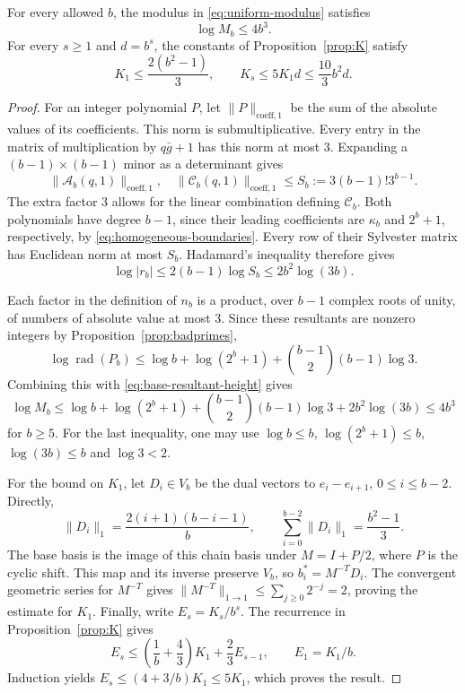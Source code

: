 \documentclass[12pt]{article}
\newcommand{\rad}{\operatorname{rad}}
\newcommand{\gpoly}{g}
\begin{document}
\begin{lemma}\label{lem:AP-heights}
For every allowed $b$, the modulus in \eqref{eq:uniform-modulus} satisfies
\[
\log M_b\le4b^3.
\]
For every $s\ge1$ and $d=b^s$, the constants of Proposition~\ref{prop:K} satisfy
\[
K_1\le\frac{2(b^2-1)}3,\qquad
K_s\le5K_1d\le\frac{10}{3}b^2d.
\]
\end{lemma}
\begin{proof}
For an integer polynomial $P$, let $\|P\|_{\mathrm{coeff},1}$ be the sum of the
absolute values of its coefficients. This norm is submultiplicative.
Every entry in the matrix of multiplication by $q\bar\gpoly+1$ has this norm
at most $3$. Expanding a $(b-1)\times(b-1)$ minor as a determinant gives
\[
\|\mathcal A_b(q,1)\|_{\mathrm{coeff},1},\quad
\|\mathcal C_b(q,1)\|_{\mathrm{coeff},1}
\le S_b:=3(b-1)!3^{b-1}.
\]
The extra factor $3$ allows for the linear combination defining $\mathcal C_b$.
Both polynomials have degree $b-1$, since their leading coefficients are
$\kappa_b$ and $2^b+1$, respectively, by \eqref{eq:homogeneous-boundaries}.
Every row of their Sylvester matrix has Euclidean norm at most $S_b$.
Hadamard's inequality therefore gives
\begin{equation}\label{eq:base-resultant-height}
\log|r_b|\le2(b-1)\log S_b\le2b^2\log(3b).
\end{equation}

Each factor in the definition of $n_b$ is a product, over $b-1$ complex roots
of unity, of numbers of absolute value at most $3$. Since these resultants
are nonzero integers by Proposition~\ref{prop:badprimes},
\[
\log\rad(P_b)\le\log b+\log(2^b+1)
+\binom{b-1}{2}(b-1)\log3.
\]
Combining this with \eqref{eq:base-resultant-height} gives
\[
\log M_b\le\log b+\log(2^b+1)
+\binom{b-1}{2}(b-1)\log3+2b^2\log(3b)\le4b^3
\]
for $b\ge5$. For the last inequality, one may use
$\log b\le b$, $\log(2^b+1)\le b$, $\log(3b)\le b$ and $\log3<2$.

For the bound on $K_1$, let $D_i\in V_b$ be the dual vectors to
$e_i-e_{i+1}$, $0\le i\le b-2$. Directly,
\[
\|D_i\|_1=\frac{2(i+1)(b-i-1)}b,
\qquad \sum_{i=0}^{b-2}\|D_i\|_1=\frac{b^2-1}{3}.
\]
The base basis is the image of this chain basis under $M=I+P/2$, where $P$ is
the cyclic shift. This map and its inverse preserve $V_b$, so
$b_i^*=M^{-T}D_i$. The convergent geometric series for $M^{-T}$ gives
$\|M^{-T}\|_{1\to1}\le\sum_{j\ge0}2^{-j}=2$, proving the estimate for $K_1$.
Finally, write $E_s=K_s/b^s$. The recurrence in Proposition~\ref{prop:K} gives
\[
E_s\le\left(\frac1b+\frac43\right)K_1+\frac23E_{s-1},\qquad E_1=K_1/b.
\]
Induction yields $E_s\le(4+3/b)K_1\le5K_1$, which proves the result.
\end{proof}
\end{document}
